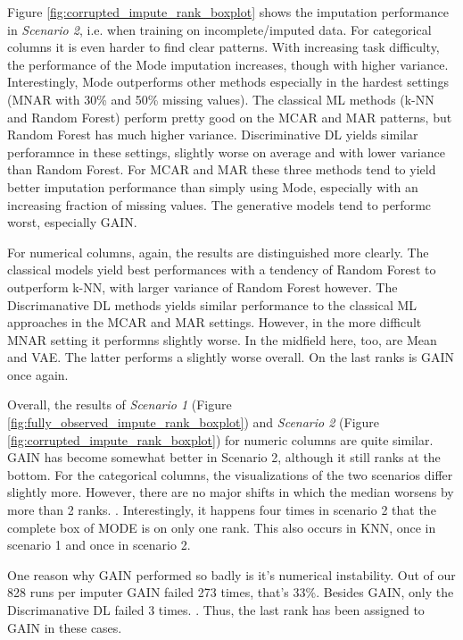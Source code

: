 Figure \ref{fig:corrupted_impute_rank_boxplot} shows the imputation performance in \textit{Scenario 2}, i.e. when training on incomplete/imputed data. For categorical columns it is even harder to find clear patterns. With increasing task difficulty, the performance of the Mode imputation increases, though with higher variance. Interestingly, Mode outperforms other methods especially in the hardest settings (MNAR with 30\% and 50\% missing values). The classical ML methods (k-NN and Random Forest) perform pretty good on the MCAR and MAR patterns, but Random Forest has much higher variance. Discriminative DL yields similar perforamnce in these settings, slightly worse on average and with lower variance than Random Forest. For MCAR and MAR these three methods tend to yield better imputation performance than simply using Mode, especially with an increasing fraction of missing values. The generative models tend to performc worst, especially GAIN.

For numerical columns, again, the results are distinguished more clearly. The classical models yield best performances with a tendency of Random Forest to outperform k-NN, with larger variance of Random Forest however. The Discrimanative DL methods yields similar performance to the classical ML approaches in the MCAR and MAR settings. However, in the more difficult MNAR setting it performns slightly worse. In the midfield here, too, are Mean and VAE. The latter performs a slightly worse overall. On the last ranks is GAIN once again.

Overall, the results of \textit{Scenario 1} (Figure \ref{fig:fully_observed_impute_rank_boxplot}) and \textit{Scenario 2} (Figure \ref{fig:corrupted_impute_rank_boxplot}) for numeric columns are quite similar. GAIN has become somewhat better in Scenario 2, although it still ranks at the bottom. For the categorical columns, the visualizations of the two scenarios differ slightly more. However, there are no major shifts in which the median worsens by more than 2 ranks. . Interestingly, it happens four times in scenario 2 that the complete box of MODE is on only one rank. This also occurs in KNN, once in scenario 1 and once in scenario 2.

One reason why GAIN performed so badly is it's numerical instability. Out of our 828 runs per imputer GAIN failed 273 times, that's 33\%. Besides GAIN, only the Discrimanative DL failed 3 times. . Thus, the last rank has been assigned to GAIN in these cases.



